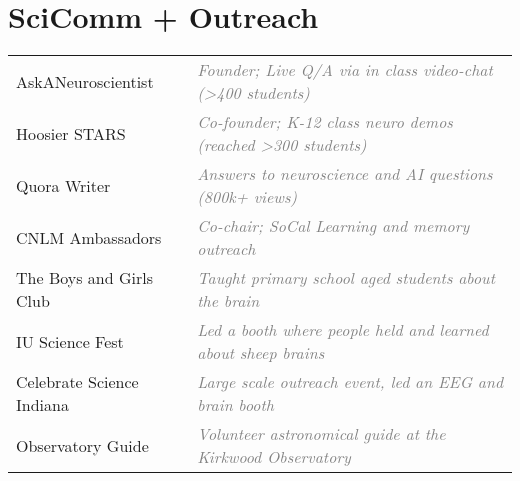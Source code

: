 \documentclass[10pt]{cooperCV2}
\begin{document}
\section{SciComm + Outreach}

\begin{longtable}{@{} l @{\extracolsep{\fill}}  l @{}}
	 
	AskANeuroscientist & \textcolor{grey}{ \textit{Founder; Live Q/A via in class video-chat (>400 students)}} \\
	 
	Hoosier STARS & \textcolor{grey}{ \textit{Co-founder; K-12 class neuro demos (reached >300 students)}} \\
	 
	Quora Writer & \textcolor{grey}{ \textit{Answers to neuroscience and AI questions (800k+ views)}} \\
	 
	CNLM Ambassadors & \textcolor{grey}{ \textit{Co-chair; SoCal Learning and memory outreach}} \\
	 
	The Boys and Girls Club & \textcolor{grey}{ \textit{Taught primary school aged students about the brain}} \\
	 
	IU Science Fest & \textcolor{grey}{ \textit{Led a booth where people held and learned about sheep brains}} \\
	 
	Celebrate Science Indiana & \textcolor{grey}{ \textit{Large scale outreach event, led an EEG and brain booth}} \\
	 
	Observatory Guide & \textcolor{grey}{ \textit{Volunteer astronomical guide at the Kirkwood Observatory}} \\
	
\end{longtable}






%	









\end{document}
